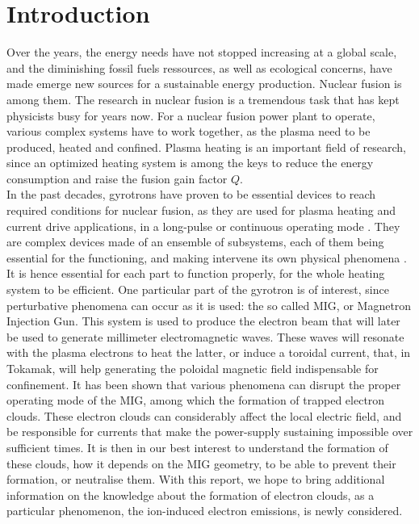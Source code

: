 \section{Introduction}

Over the years, the energy needs have not stopped increasing at a global scale, and the diminishing fossil fuels ressources, as well as ecological concerns, have made emerge new sources for a sustainable energy production. Nuclear fusion is among them. The research in nuclear fusion is a tremendous task that has kept physicists busy for years now. For a nuclear fusion power plant to operate, various complex systems have to  work together, as the plasma need to be produced, heated and confined. Plasma heating is an important field of research, since an optimized heating system is among the keys to reduce the energy consumption and raise the fusion gain factor $Q$. \\

In the past decades, gyrotrons have proven to be essential devices to reach required conditions for nuclear fusion, as they are used for plasma heating and current drive applications, in a long-pulse or continuous operating mode \cite{Fisch}. They are complex devices made of an ensemble of subsystems, each of them being essential for the functioning, and making intervene its own physical phenomena \cite{ITER_gyrotrons}. It is hence essential for each part to function properly, for the whole heating system to be efficient. One particular part of the gyrotron is of interest, since perturbative phenomena can occur as it is used: the so called MIG, or Magnetron Injection Gun. This system is used to produce the electron beam that will later be used to generate millimeter electromagnetic waves. These waves will resonate with the plasma electrons to heat the latter, or induce a toroidal current, that, in Tokamak, will help generating the poloidal magnetic field indispensable for confinement. It has been shown that various phenomena can disrupt the proper operating mode of the MIG, among which the formation of trapped electron clouds. These electron clouds can considerably affect the local electric field, and be responsible for currents that make the power-supply sustaining impossible over sufficient times. It is then in our best interest to understand the formation of these clouds, how it depends on the MIG geometry, to be able to prevent their formation, or neutralise them. With this report, we hope to bring additional information on the knowledge about the formation of electron clouds, as a particular phenomenon, the ion-induced electron emissions, is newly considered. \\

